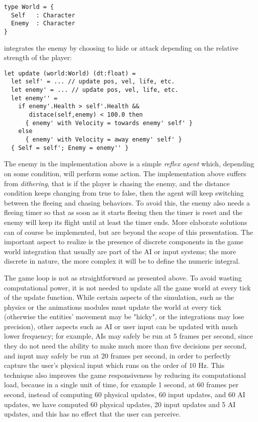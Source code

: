 \begin{lstlisting}
type World = {
  Self   : Character
  Enemy  : Character 
}
\end{lstlisting}
  
 integrates the enemy by choosing to hide or attack depending on the relative strength of the player:

\begin{lstlisting}
let update (world:World) (dt:float) =
  let self' = ... // update pos, vel, life, etc.
  let enemy' = ... // update pos, vel, life, etc.
  let enemy'' = 
    if enemy'.Health > self'.Health && 
       distace(self,enemy) < 100.0 then
      { enemy' with Velocity = towards enemy' self' }
    else
      { enemy' with Velocity = away enemy' self' }
  { Self = self'; Enemy = enemy'' }
\end{lstlisting}

The enemy in the implementation above is a simple \textit{reflex agent} which, depending on some condition, will perform some action. The implementation above suffers from \textit{dithering}, that is if the player is chasing the enemy, and the distance condition keeps changing from true to false, then the agent will keep switching between the fleeing and chasing behaviors. To avoid this, the enemy also needs a fleeing timer so that as soon as it starts fleeing then the timer is reset and the enemy will keep its flight until at least the timer ends. More elaborate solutions can of course be implemented, but are beyond the scope of this presentation. The important aspect to realize is the presence of discrete components in the game world integration that usually are part of the AI or input systems; the more discrete in nature, the more complex it will be to define the numeric integral.

The game loop is not as straightforward as presented above. To avoid wasting computational power, it is not needed to update all the game world at every tick of the update function. While certain aspects of the simulation, such as the physics or the animations modules must update the world at every tick (otherwise the entities' movement may be "hicky", or the integrations may lose precision), other aspects such as AI or user input can be updated with much lower frequency; for example, AIs may safely be run at 5 frames per second, since they do not need the ability to make much more than five decisions per second, and input may safely be run at 20 frames per second, in order to perfectly capture the user's physical input which runs on the order of 10 Hz. This technique also improves the game responsiveness by reducing its computational load, because in a single unit of time, for example 1 second, at 60 frames per second, instead of computing 60 physical updates, 60 input updates, and 60 AI updates, we have computed 60 physical updates, 20 input updates and 5 AI updates, and this has no effect that the user can perceive.

